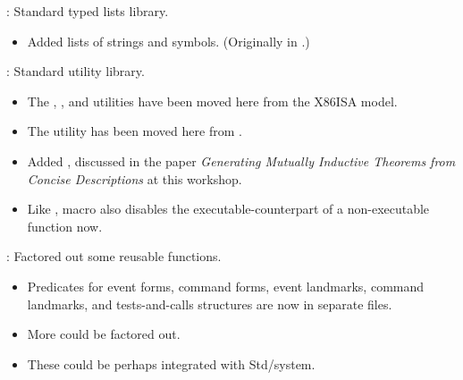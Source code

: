 
\begin{frame}

\implibtitle

:
Standard typed lists library.
\begin{itemize}
\item
Added lists of strings and symbols.
(Originally in .)
\end{itemize}

\separation

:
Standard utility library.
\begin{itemize}
\item
The
,
, and
utilities have been moved here from the X86ISA model.
\item
The  utility has been moved here
from .
\item Added , discussed in the paper \textit{Generating Mutually Inductive Theorems from Concise Descriptions} at this workshop.
\item
Like ,  macro also disables the executable-counterpart of a non-executable function now.
\end{itemize}

\end{frame}


\begin{frame}

\implibtitle

:
Factored out some reusable functions.
\begin{itemize}
\item
Predicates for
event forms,
command forms,
event landmarks,
command landmarks, and
tests-and-calls structures
are now in separate files.
\item
More could be factored out.
\item
These could be perhaps integrated with Std/system.
\end{itemize}

\end{frame}

